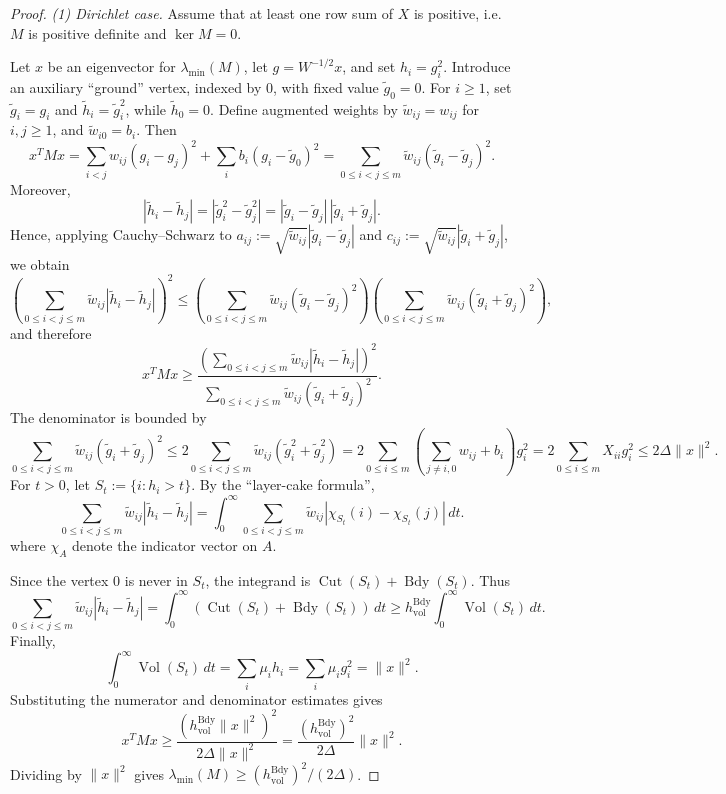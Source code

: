 \documentclass{article}
\begin{document}
\begin{proof}
\emph{(1) Dirichlet case.}
Assume that at least one row sum of \(X\) is positive, i.e. $M$ is positive definite and $\ker M =0$. 

Let \(x\) be an eigenvector for \(\lambda_{\min}(M)\), let \(g=W^{-1/2}x\), and set \(h_i=g_i^2\). Introduce an auxiliary ``ground'' vertex, indexed by \(0\), with fixed value \(\widetilde g_0=0\). For \(i\geq 1\), set \(\widetilde g_i=g_i\) and \(\widetilde h_i=\widetilde g_i^2\), while \(\widetilde h_0=0\). Define augmented weights by \(\widetilde w_{ij}=w_{ij}\) for \(i,j\geq 1\), and \(\widetilde w_{i0}=b_i\). Then
\[
x^TMx=\sum_{i<j}w_{ij}(g_i-g_j)^2+\sum_i b_i(g_i-\widetilde g_0)^2=\sum_{0\leq i<j\leq m}\widetilde w_{ij}(\widetilde g_i-\widetilde g_j)^2.
\]
Moreover,
\[
|\widetilde h_i-\widetilde h_j|=|\widetilde g_i^2-\widetilde g_j^2|=|\widetilde g_i-\widetilde g_j|\,|\widetilde g_i+\widetilde g_j|.
\]
Hence, applying Cauchy--Schwarz to \(a_{ij}:=\sqrt{\widetilde w_{ij}}|\widetilde g_i-\widetilde g_j|\) and \(c_{ij}:=\sqrt{\widetilde w_{ij}}|\widetilde g_i+\widetilde g_j|\), we obtain
\[
\left(\sum_{0\leq i<j\leq m}\widetilde w_{ij}|\widetilde h_i-\widetilde h_j|\right)^2
\leq
\left(\sum_{0\leq i<j\leq m}\widetilde w_{ij}(\widetilde g_i-\widetilde g_j)^2\right)
\left(\sum_{0\leq i<j\leq m}\widetilde w_{ij}(\widetilde g_i+\widetilde g_j)^2\right),
\]
and therefore
\[
x^TMx\geq
\frac{\left(\sum_{0\leq i<j\leq m}\widetilde w_{ij}|\widetilde h_i-\widetilde h_j|\right)^2}
{\sum_{0\leq i<j\leq m}\widetilde w_{ij}(\widetilde g_i+\widetilde g_j)^2}.
\]
The denominator is bounded by
\[
\sum_{0\leq i<j\leq m}\widetilde w_{ij}(\widetilde g_i+\widetilde g_j)^2
\leq 2\sum_{0\leq i<j\leq m}\widetilde w_{ij}(\widetilde g_i^2+\widetilde g_j^2)
=
2\sum_{0\leq i\leq m}\left(\sum_{j\neq i,0}w_{ij}+b_i\right)g_i^2
=
2\sum_{0\leq i\leq m}X_{ii}g_i^2
\leq 2\Delta\|x\|^2.
\]
For \(t>0\), let \(S_t:=\{i:h_i>t\}\). By the ``layer-cake formula'',
\[
\sum_{0\leq i<j\leq m}\widetilde w_{ij}|\widetilde h_i-\widetilde h_j|
=
\int_0^\infty
\sum_{0\leq i<j\leq m}\widetilde w_{ij}
|\chi_{S_t}(i)-\chi_{S_t}(j)|\,dt.
\]
where $\chi_A$ denote the indicator vector on $A$. 

Since the vertex \(0\) is never in \(S_t\), the integrand is \(\operatorname{Cut}(S_t)+\operatorname{Bdy}(S_t)\). Thus
\[
\sum_{0\leq i<j\leq m}\widetilde w_{ij}|\widetilde h_i-\widetilde h_j|
=
\int_0^\infty\left(\operatorname{Cut}(S_t)+\operatorname{Bdy}(S_t)\right)\,dt
\geq
h_{\mathrm{vol}}^{\mathrm{Bdy}}\int_0^\infty\operatorname{Vol}(S_t)\,dt.
\]
Finally,
\[
\int_0^\infty\operatorname{Vol}(S_t)\,dt=\sum_i\mu_i h_i=\sum_i\mu_i g_i^2=\|x\|^2.
\]
Substituting the numerator and denominator estimates gives
\[
x^TMx\geq
\frac{\left(h_{\mathrm{vol}}^{\mathrm{Bdy}}\|x\|^2\right)^2}{2\Delta\|x\|^2}
=
\frac{(h_{\mathrm{vol}}^{\mathrm{Bdy}})^2}{2\Delta}\|x\|^2.
\]
Dividing by \(\|x\|^2\) gives \(\lambda_{\min}(M)\geq (h_{\mathrm{vol}}^{\mathrm{Bdy}})^2/(2\Delta)\).


\end{proof}
\end{document}
